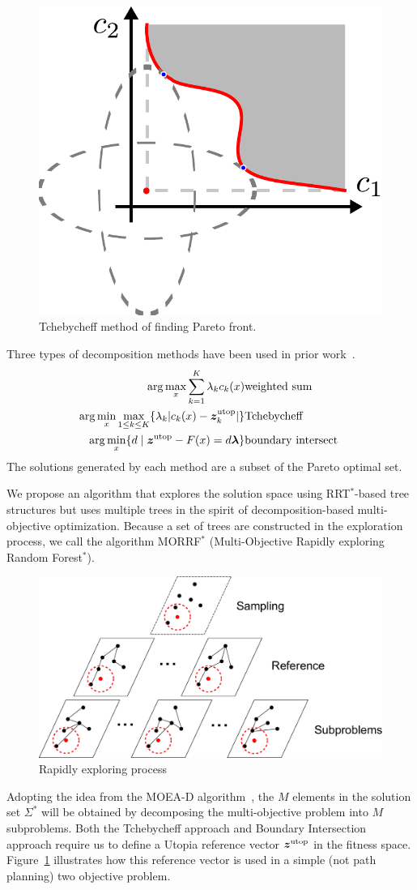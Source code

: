 \documentclass[phd]{byuprop}
\begin{document}
\begin{figure}
	\centering
	\includegraphics[width=0.3\linewidth]{fig/Tchebycheff}
	\caption{Tchebycheff method of finding Pareto front.}
	\label{fig:Tchebycheff}
\end{figure}

Three types of decomposition methods have been used in prior work~\cite{Zhang2007}.
\begin{eqnarray}
\arg\max_x \sum_{k=1}^{K} \lambda_{k} c_{k} (x) & {\rm weighted \ sum} \label{eq:weighted}\\
\arg\min_x\max_{1 \leq k \leq K}  \{ \lambda_{k} | c_{k}(x) - \bm{z}^{\rm utop}_{k}  | \} & {\rm Tchebycheff} \label{eq:Tchebycheff}\\
\arg\min_x \{ d \mid \bm{z}^{\rm utop} - F(x) = d \bm{\lambda} \} & {\rm boundary \ intersect\ } \label{eq:boundary}
\end{eqnarray}
The solutions generated by each method are a subset of the Pareto optimal set.

We propose an algorithm that explores the solution space using RRT$^{*}$-based tree structures but uses multiple trees in the spirit of decomposition-based multi-objective optimization.
Because a set of trees are constructed in the exploration process, we call the algorithm MORRF$^{*}$ (Multi-Objective Rapidly exploring Random Forest$^{*}$).

\begin{figure}
	\centering
	\includegraphics[width=0.55\linewidth]{./fig/MORRTstar}
	\caption{Rapidly exploring process}
	\label{fig:MORRTstar}
\end{figure}

Adopting the idea from the MOEA-D algorithm~\cite{Zhang2007}, the $M$ elements in the solution set $\Sigma^{*}$ will be obtained by decomposing the multi-objective problem into $ M $ subproblems.  
Both the Tchebycheff approach and Boundary Intersection approach require us to define a Utopia reference vector $ \bm{z}^{\rm utop} $ in the fitness space. 
Figure~\ref{fig:Tchebycheff} illustrates how this reference vector is used in a simple (not path planning) two objective problem.  
\end{document}
